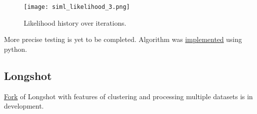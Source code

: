 \documentclass[a4paper, 12pt]{article}
\theoremstyle{definition}
\theoremstyle{definition}
\theoremstyle{remark}
\begin{document}
\begin{figure}[H]
    \begin{center}
      \texttt{[image: siml\_likelihood\_3.png]}
      \caption{Likelihood history over iterations.}
    \endminipage
    \end{center}
\end{figure}
More precise testing is yet to be completed. 
Algorithm was \href{https://github.com/grach0v/my_SIML}{implemented} using python. 

\subsection{Longshot}
\href{https://github.com/grach0v/longshot}{Fork} of Longshot \cite{edge_longshot_2019} with features of clustering and processing multiple 
datasets is in development.  

\newpage

 


    
\end{document}
